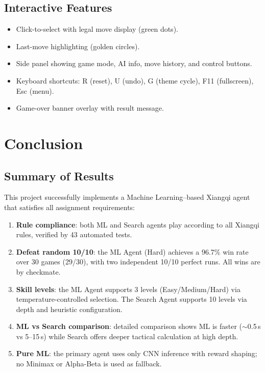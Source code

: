 \documentclass[a4paper,12pt]{article}
\begin{document}
\subsection{Interactive Features}

\begin{itemize}
    \item Click-to-select with legal move display (green dots).
    \item Last-move highlighting (golden circles).
    \item Side panel showing game mode, AI info, move history, and control buttons.
    \item Keyboard shortcuts: R (reset), U (undo), G (theme cycle), F11 (fullscreen), Esc (menu).
    \item Game-over banner overlay with result message.
\end{itemize}


\section{Conclusion}

\subsection{Summary of Results}

This project successfully implements a Machine Learning--based Xiangqi agent that satisfies all assignment requirements:

\begin{enumerate}
    \item \textbf{Rule compliance}: both ML and Search agents play according to all Xiangqi rules, verified by 43 automated tests.
    \item \textbf{Defeat random 10/10}: the ML Agent (Hard) achieves a 96.7\% win rate over 30 games (29/30), with two independent 10/10 perfect runs. All wins are by checkmate.
    \item \textbf{Skill levels}: the ML Agent supports 3 levels (Easy/Medium/Hard) via temperature-controlled selection. The Search Agent supports 10 levels via depth and heuristic configuration.
    \item \textbf{ML vs Search comparison}: detailed comparison shows ML is faster ($\sim$0.5\,s vs 5--15\,s) while Search offers deeper tactical calculation at high depth.
    \item \textbf{Pure ML}: the primary agent uses only CNN inference with reward shaping; no Minimax or Alpha-Beta is used as fallback.
\end{enumerate}
\end{document}
